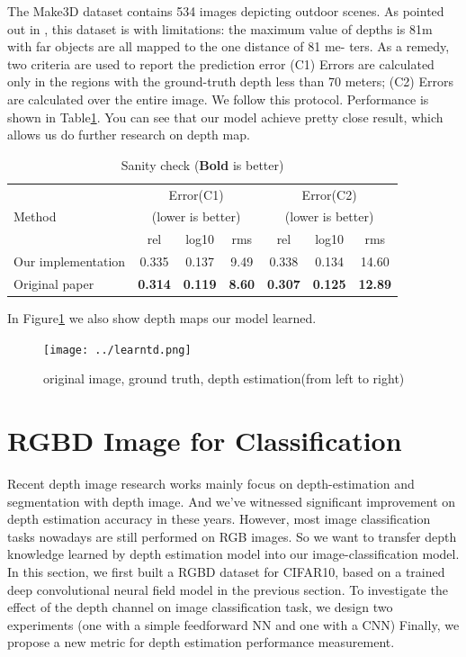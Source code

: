 \documentclass[10pt,twocolumn,letterpaper]{article}
\begin{document}
The Make3D dataset contains 534 images depicting outdoor scenes. As pointed out 
in \cite{liu2014discrete}, this dataset is with limitations: the maximum value 
of depths is 81m with far objects are all mapped to the one distance of 81 
me- ters. As a remedy, two criteria are used to report the prediction error (C1) 
Errors are calculated only in the regions with the ground-truth depth less 
than 70 meters; (C2) Errors are calculated over the entire image. We follow this 
protocol.
Performance is shown in Table\ref{tab:sanity}. 
You can see that
our model achieve pretty close result, which allows us do further research on depth map.
\begin{table} \center
\resizebox{\linewidth}{!} {
\begin{tabular}{ | l |  c  c  c | c  c  c |}
\hline 
\multirow{3}{*}{{{Method}}} &\multicolumn{3}{c|}{Error(C1)} 
&\multicolumn{3}{c|}{Error(C2)} \\
&\multicolumn{3}{c|}{(lower is better)} &\multicolumn{3}{c|}{(lower is better)} 
\\
\cline{2-7}
&rel &log10 &rms &rel &log10 &rms  \\
\hline
%
%
Our implementation &0.335&0.137&9.49&0.338&0.134&14.60 \\
Original paper    &\textbf{0.314}&\textbf{0.119}  &\textbf{8.60}  
&\textbf{0.307} 	 &\textbf{0.125}	 &\textbf{12.89} \\
\hline
\end{tabular}
}
\caption{Sanity check (\textbf{Bold} is better)}
\label{tab:sanity}
\end{table}

In Figure\ref{fig:depthest} we also show depth maps our model learned.
\begin{figure}
\texttt{[image: ../learntd.png]}
\caption{original image, ground truth, depth estimation(from left to right)}
\label{fig:depthest}
\end{figure}

\section{RGBD Image for Classification}
Recent depth image research works mainly focus on depth-estimation\cite{liu2015deep} 
and segmentation with depth image\cite{eigen2015predicting}.
And we\rq{}ve witnessed significant improvement on depth estimation accuracy in these years. 
However, most image classification tasks nowadays are still performed on RGB images.
So we want to transfer depth knowledge learned by depth estimation model into our image-classification model.
In this section, 
we first built a RGBD dataset for CIFAR10\cite{krizhevsky2009learning}, 
based on a trained deep convolutional neural field model in the previous section. 
To investigate the effect of the depth channel on image classification task, 
we design two experiments (one with a simple feedforward NN and one with a CNN) 
Finally, we propose a new metric for depth estimation performance measurement.
\end{document}
